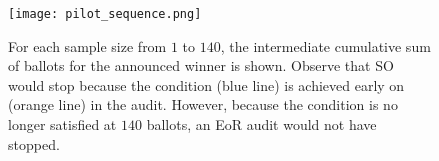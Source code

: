 \begin{figure}
\texttt{[image: pilot\_sequence.png]}
\caption{For each sample size from $1$ to $140$, the intermediate cumulative sum of ballots for the announced winner is shown. Observe that SO \BRAVO would stop because the \BRAVO condition (blue line) is achieved early on (orange line) in the audit. However, because the \BRAVO condition is no longer satisfied at $140$ ballots, an EoR \BRAVO audit would not have stopped. }
\label{fig:pilot_sequence}
\end{figure}




